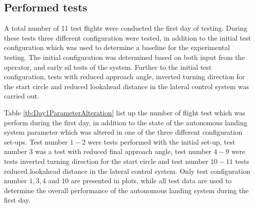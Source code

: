 \subsection{Performed tests}
A total number of 11 test flights were conducted the first day of testing. During these tests three different configuration were tested, in addition to the initial test configuration which was used to determine a baseline for the experimental testing. The initial configuration was determined based on both input from the operator, and early \gls{sil} tests of the system. Further to the initial test configuration, tests with reduced approach angle, inverted turning direction for the start circle and reduced lookahead distance in the lateral control system was carried out.

Table \ref{tb:Day1ParameterAlteration} list up the number of flight test which was perform during the first day, in addition to the state of the autonomous landing system parameter which was altered in one of the three different configuration set-ups. Test number $1-2$ were tests performed with the initial set-up, test number $3$ was a test with reduced final approach angle, test number $4-9$ were tests inverted turning direction for the start circle and test number $10-11$ tests reduced lookahead distance in the lateral control system.  Only test configuration number $1,3,4$ and $10$ are presented in plots, while all test data are used to determine the overall performance of the autonomous landing system during the first day.
\newpage
